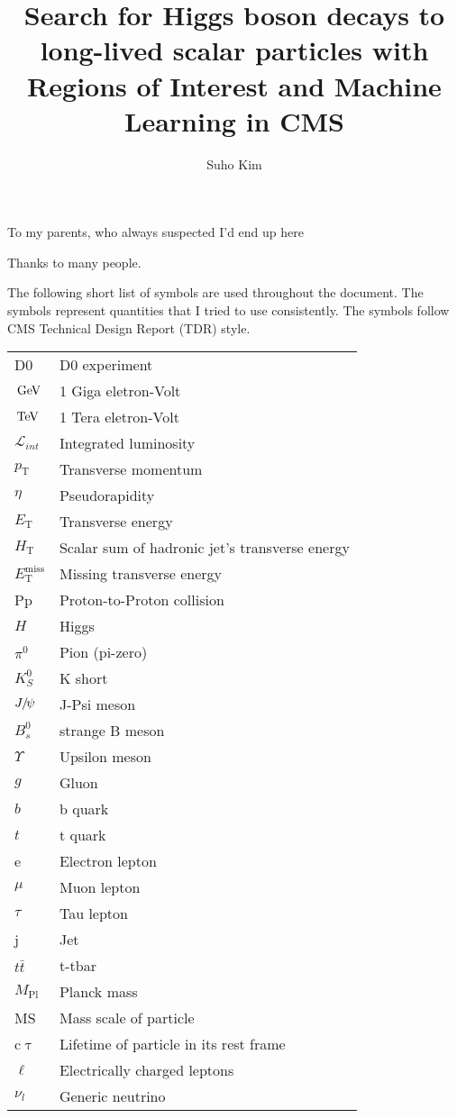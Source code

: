 \documentclass[11pt,expanded,copyright]{fsuthesis}
\title{Search for Higgs boson decays to long-lived scalar particles with Regions of Interest and Machine Learning in CMS}
\author{Suho Kim}  %
\newcommand {\DZERO}{D0\xspace}     %
\newcommand{\GeV}{\ensuremath{\,\text{Ge\hspace{-.08em}V}}\xspace}
\newcommand{\TeV}{\ensuremath{\,\text{Te\hspace{-.08em}V}}\xspace}
\newcommand{\Lumi}{\ensuremath{\mathcal{L}}\xspace}%
\newcommand{\Mpl}{\ensuremath{{M_\mathrm{Pl}}}\xspace}%
\newcommand{\pt}{\ensuremath{p_{\mathrm{T}}}\xspace}
\newcommand{\ET}{\ensuremath{E_{\mathrm{T}}}\xspace}
\newcommand{\HT}{\ensuremath{H_{\mathrm{T}}}\xspace}
\newcommand{\ETm}{\ensuremath{E_{\mathrm{T}}^{\text{miss}}}\xspace}
\newcommand{\MET}{\ETm}
\newcommand{\cmsSymbolFace}[1]{#1}
\providecommand{\PH}{\ensuremath{\cmsSymbolFace{H}}\xspace} %
\providecommand{\PJGy}{\ensuremath{\cmsSymbolFace{J}\hspace{-.08em}/\hspace{-.14em}\psi}\xspace} %
\providecommand{\PBzs}{\ensuremath{\cmsSymbolFace{B}^0_\cmsSymbolFace{s}}\xspace} %
\providecommand{\Pg}{\ensuremath{\cmsSymbolFace{g}}\xspace} %
\providecommand{\PGnl}{\ensuremath{\nu_\cmsSymbolFace{l}}\xspace} %
\providecommand{\PQt}{\ensuremath{\cmsSymbolFace{t}}\xspace} %
\providecommand{\PQb}{\ensuremath{\cmsSymbolFace{b}}\xspace} %
\providecommand{\PAQt}{\ensuremath{\bar{\cmsSymbolFace{t}}}\xspace} %
\providecommand{\PKzS}{\ensuremath{\cmsSymbolFace{K}^0_\cmsSymbolFace{S}}\xspace} %
\newcommand{\ttbar}{{\PQt{}\PAQt}\xspace} %
\begin{document}
\frontmatter          %
\maketitle            %
\makecommitteepage    %

\begin{dedication}
\centering
To my parents, who always suspected I'd end up here
\end{dedication}

\begin{acknowledgments}
Thanks to many people.
\end{acknowledgments}

\tableofcontents
\listoftables
\listoffigures
\begin{listofsymbols}
The following short list of symbols are used throughout the document.
The symbols represent quantities that I tried to use consistently.
The symbols follow CMS Technical Design Report (TDR) style.
\begin{center}
\begin{tabular}{ll}
\DZERO & D0 experiment \\
\GeV & 1 Giga eletron-Volt \\
\TeV & 1 Tera eletron-Volt \\
$\Lumi_{int}$ & Integrated luminosity\\
\pt & Transverse momentum \\
$\eta$ & Pseudorapidity \\
\ET & Transverse energy\\
\HT & Scalar sum of hadronic jet's transverse energy\\
\MET & Missing transverse energy\\
Pp & Proton-to-Proton collision\\
\PH & Higgs\\
$\pi^{0}$ & Pion (pi-zero)\\
$\PKzS$ & K short\\
\PJGy & J-Psi meson\\
$\PBzs$ & strange B meson\\
$\Upsilon$ & Upsilon meson\\
\Pg & Gluon\\
\PQb & b quark\\
\PQt & t quark\\
e & Electron lepton\\
$\mu$ & Muon lepton\\
$\tau$ & Tau lepton\\
j & Jet\\
\ttbar & t-tbar \\
\Mpl & Planck mass\\
MS & Mass scale of particle\\
c$\uptau$ & Lifetime of particle in its rest frame\\
$\ell$ & Electrically charged leptons\\
\PGnl & Generic neutrino\\
\end{tabular}
\end{center}
\end{listofsymbols}
\end{document}
